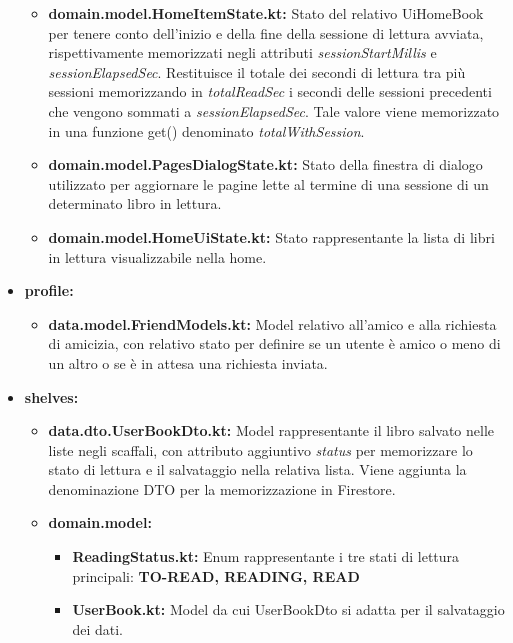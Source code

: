 \documentclass{article}
\begin{document}
\begin{itemize}
\begin{itemize}
    \item \textbf{domain.model.HomeItemState.kt:} Stato del relativo UiHomeBook per tenere conto dell'inizio e della fine della sessione di lettura avviata, rispettivamente memorizzati negli attributi \textit{sessionStartMillis} e \textit{sessionElapsedSec}.
    Restituisce il totale dei secondi di lettura tra più sessioni memorizzando in \textit{totalReadSec} i secondi delle sessioni precedenti che vengono sommati a \textit{sessionElapsedSec}. Tale valore viene memorizzato in una funzione get() denominato \textit{totalWithSession}.
    \item \textbf{domain.model.PagesDialogState.kt:} Stato della finestra di dialogo utilizzato per aggiornare le pagine lette al termine di una sessione di un determinato libro in lettura.
    \item \textbf{domain.model.HomeUiState.kt:} Stato rappresentante la lista di libri in lettura visualizzabile nella home.
    
  \end{itemize}
  \item \textbf{profile:}
  \begin{itemize}
    \item \textbf{data.model.FriendModels.kt:} Model relativo all'amico e alla richiesta di amicizia, 
    con relativo stato per definire se un utente è amico o meno di un altro o se è in attesa una richiesta inviata.
  \end{itemize}
  \item \textbf{shelves:}
  \begin{itemize}
    \item \textbf{data.dto.UserBookDto.kt:} Model rappresentante il libro salvato nelle liste negli scaffali, con attributo aggiuntivo \textit{status} per memorizzare lo stato di lettura e il salvataggio nella relativa lista.
    Viene aggiunta la denominazione DTO per la memorizzazione in Firestore.
    \item \textbf{domain.model:}
    \begin{itemize}
      \item \textbf{ReadingStatus.kt:} Enum rappresentante i tre stati di lettura principali: \textbf{TO-READ, READING, READ}
      \item \textbf{UserBook.kt:} Model da cui UserBookDto si adatta per il salvataggio dei dati.
    \end{itemize}
  \end{itemize}
\end{itemize}
\end{document}
